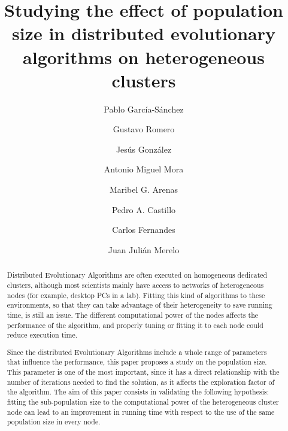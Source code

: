 \documentclass[final,1p,times]{elsarticle}
\begin{document}
\begin{frontmatter}



\title{Studying the effect of population size in distributed evolutionary
  algorithms on heterogeneous clusters}


\author[ugr]{Pablo Garc\'ia-S\'anchez}
\author[ugr]{Gustavo Romero}
\author[ugr]{Jes\'us Gonz\'alez}
\author[ugr]{Antonio Miguel Mora}
\author[ugr]{Maribel G. Arenas}
\author[ugr]{Pedro A. Castillo}
\author[laseeb]{Carlos Fernandes}
\author[ugr]{Juan Juli\'an Merelo}


\address[ugr]{Department of Computer Architecture and Computer Technology and CITIC-UGR, University of Granada, Granada, Spain. Tel: +34958241778. Fax: +34958248993}
\address[laseeb]{LaSEEB-ISR-IST, Technical University of Lisbon (IST), Lisbon, Portugal}%


\begin{abstract}


Distributed Evolutionary Algorithms are often executed on homogeneous dedicated clusters, 
although most scientists mainly have access to networks of heterogeneous nodes (for example, desktop PCs in a lab). 
Fitting this kind of algorithms to these environments, so that they
can take advantage of their heterogeneity to save running time, is
still an issue. The different computational power of the nodes affects
the performance of the algorithm, and properly tuning or fitting it
to each node could reduce execution time. 

Since the distributed Evolutionary Algorithms include a whole range of parameters that influence the performance, 
this paper proposes a study on the population size. This parameter  is one of the most important, 
since it has a direct relationship with the number of iterations needed to find the solution, as it affects
the exploration factor of the algorithm. 
The aim of this paper consists in validating the following hypothesis: fitting the sub-population size to the computational power of the heterogeneous cluster node can lead to an improvement in running time with respect to the use of the same population size in every node. 


\end{abstract}
\end{frontmatter}
\end{document}
